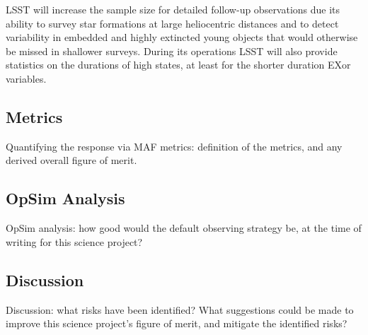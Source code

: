 LSST will increase the sample size for detailed follow-up observations due its ability to survey
star formations at large heliocentric distances and to detect variability in embedded and highly
extincted young objects that would otherwise be missed in shallower surveys. During its operations
LSST will also provide statistics on the durations of high states, at least for the shorter duration
EXor variables.





\subsection{Metrics}
\label{sec:\secname:metrics}

Quantifying the response via MAF metrics: definition of the metrics,
and any derived overall figure of merit.



\subsection{OpSim Analysis}
\label{sec:\secname:analysis}

OpSim analysis: how good would the default observing strategy be, at
the time of writing for this science project?



\subsection{Discussion}
\label{sec:\secname:discussion}

Discussion: what risks have been identified? What suggestions could be
made to improve this science project's figure of merit, and mitigate
the identified risks?



\navigationbar
